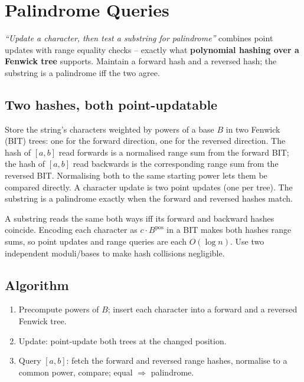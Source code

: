 \section{Palindrome Queries}
\label{sec:cses-palindrome-queries}


\begin{patternbox}
\emph{``Update a character, then test a substring for palindrome''}
combines point updates with range equality checks -- exactly what
\textbf{polynomial hashing over a Fenwick tree} supports. Maintain a
forward hash and a reversed hash; the substring is a palindrome iff the
two agree.
\end{patternbox}

\subsection*{Two hashes, both point-updatable}

Store the string's characters weighted by powers of a base $B$ in two
Fenwick (BIT) trees: one for the forward direction, one for the reversed
direction. The hash of $[a,b]$ read forwards is a normalised range sum
from the forward BIT; the hash of $[a,b]$ read backwards is the
corresponding range sum from the reversed BIT. Normalising both to the
same starting power lets them be compared directly. A character update is
two point updates (one per tree). The substring is a palindrome exactly
when the forward and reversed hashes match.

\begin{ideabox}[Palindrome = Forward Hash Equals Reversed Hash]
A substring reads the same both ways iff its forward and backward hashes
coincide. Encoding each character as $c\cdot B^{\text{pos}}$ in a BIT makes
both hashes range sums, so point updates and range queries are each
$O(\log n)$. Use two independent moduli/bases to make hash collisions
negligible.
\end{ideabox}

\subsection*{Algorithm}

\begin{enumerate}
  \item Precompute powers of $B$; insert each character into a forward
        and a reversed Fenwick tree.
  \item Update: point-update both trees at the changed position.
  \item Query $[a,b]$: fetch the forward and reversed range hashes,
        normalise to a common power, compare; equal $\Rightarrow$
        palindrome.
\end{enumerate}

